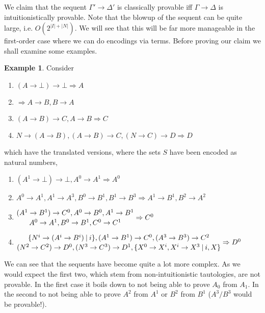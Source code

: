 \documentclass[a4paper,12pt]{article}
\theoremstyle{definition}
\theoremstyle{definition}
\theoremstyle{definition}
\theoremstyle{definition}
\theoremstyle{definition}
\theoremstyle{definition}
\newtheorem{example}[theorem]{Example}
\begin{document}
	We claim that the sequent $\Gamma'\to\Delta'$ is classically provable iff $\Gamma\to\Delta$ is intuitionistically provable. Note that the blowup of the sequent can be quite large, i.e. $O(2^{|I| + |N|})$. We will see that this will be far more manageable in the first-order case where we can do encodings via terms. Before proving our claim we shall examine some examples. 
	\begin{example}
		Consider \begin{enumerate}
			\item $(A\to \bot)\to \bot\Rightarrow A$
			\item $\Rightarrow A\to B, B\to A$
			\item $(A\to B)\to C, A\to B\Rightarrow C$
			\item $N\to (A\to B), (A\to B)\to C, (N\to C)\to D\Rightarrow D$ 
		\end{enumerate}
	which have the translated versions, where the sets $S$ have been encoded as natural numbers,
	\begin{enumerate}
		\item $(A^1\to \bot)\to \bot, A^0\to A^1\Rightarrow A^0$
		\item $A^0\to A^1, A^1\to A^3, B^0\to B^1, B^1\to B^3\Rightarrow A^1\to B^1, B^2\to A^2$
		\item $\stackanchor{$(A^1\to B^1)\to C^0, A^0\to B^0, A^1\to B^1$}{$A^0\to A^1, B^0\to B^1, C^0\to C^1$}\Rightarrow C^0$
		\item $\stackanchor{$\{N^i\to (A^i\to B^i)\:|\:i\},(A^1\to B^1)\to C^0, (A^3\to B^3)\to C^2$}{$(N^2\to C^2)\to D^0, (N^3\to C^3)\to D^1, \{X^0\to X^i, X^i\to X^3\:|\:i, X\}$}\Rightarrow D^0$ 
	\end{enumerate}
	We can see that the sequents have become quite a lot more complex. As we would expect the first two, which stem from non-intuitionistic tautologies, are not provable. In the first case it boils down to not being able to prove $A_0$ from $A_1$. In the second to not being able to prove $A^2$ from $A^1$ or $B^2$ from $B^1$ ($A^3/B^3$ would be provable!).
	

\end{example}
\end{document}
